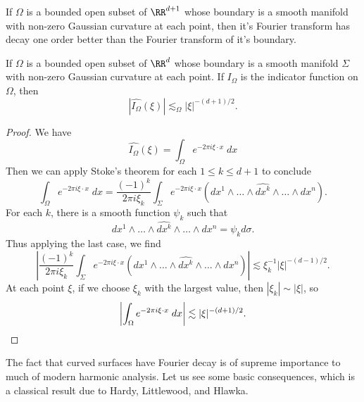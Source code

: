 If $\Omega$ is a bounded open subset of $\RR^{d+1}$ whose boundary is a smooth manifold with non-zero Gaussian curvature at each point, then it's Fourier transform has decay one order better than the Fourier transform of it's boundary.

\begin{corollary}
  If $\Omega$ is a bounded open subset of $\RR^d$ whose boundary is a smooth manifold $\Sigma$ with non-zero Gaussian curvature at each point. If $I_\Omega$ is the indicator function on $\Omega$, then
  \[ |\widehat{I_\Omega}(\xi)| \lesssim_\Omega |\xi|^{-(d+1)/2}. \]
\end{corollary}
\begin{proof}
  We have
  \[ \widehat{I_\Omega}(\xi) = \int_\Omega e^{-2 \pi i \xi \cdot x}\; dx \]
  Then we can apply Stoke's theorem for each $1 \leq k \leq d+1$ to conclude
  \[ \int_\Omega e^{-2 \pi i \xi \cdot x}\; dx = \frac{(-1)^k}{2 \pi i \xi_k} \int_\Sigma e^{-2 \pi i \xi \cdot x} (dx^1 \wedge \dots \wedge \widehat{dx^k} \wedge \dots \wedge dx^n). \]
  For each $k$, there is a smooth function $\psi_k$ such that
  \[ dx^1 \wedge \dots \wedge \widehat{dx^k} \wedge \dots \wedge dx^n = \psi_k d\sigma. \]
  Thus applying the last case, we find
  \[ \left| \frac{(-1)^k}{2 \pi i \xi_k} \int_\Sigma e^{-2 \pi i \xi \cdot x} (dx^1 \wedge \dots \wedge \widehat{dx^k} \wedge \dots \wedge dx^n) \right| \lesssim \xi_k^{-1} |\xi|^{-(d-1)/2}. \]
  At each point $\xi$, if we choose $\xi_k$ with the largest value, then $|\xi_k| \sim |\xi|$, so
  \[ \left| \int_\Omega e^{-2 \pi i \xi \cdot x}\; dx \right| \lesssim |\xi|^{-(d+1)/2}. \qedhere \]
\end{proof}

The fact that curved surfaces have Fourier decay is of supreme importance to much of modern harmonic analysis. Let us see some basic consequences, which is a classical result due to Hardy, Littlewood, and Hlawka.

